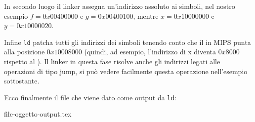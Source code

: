 \documentclass[class=book, crop=false, oneside]{standalone}
\begin{document}
In secondo luogo il linker assegna un'indirizzo assoluto ai simboli, nel nostro esempio \(f=0x00400000\) e \(g=0x00400100\), mentre \(x=0x10000000\) e \(y=0x10000020\).

Infine \texttt{ld} patcha tutti gli indirizzi dei simboli tenendo conto che il  in MIPS punta alla posizione \(0x10008000\) (quindi, ad esempio, l'indirizzo di x diventa \(0x8000\) rispetto al ). Il linker in questa fase risolve anche gli indirizzi legati alle operazioni di tipo jump, si può vedere facilmente questa operazione nell'esempio sottostante.

Ecco finalmente il file che viene dato come output da \texttt{ld}:
\begin{table}[H]
	{file-oggetto-output.tex}
	\caption{File di output}
\end{table}
\end{document}
